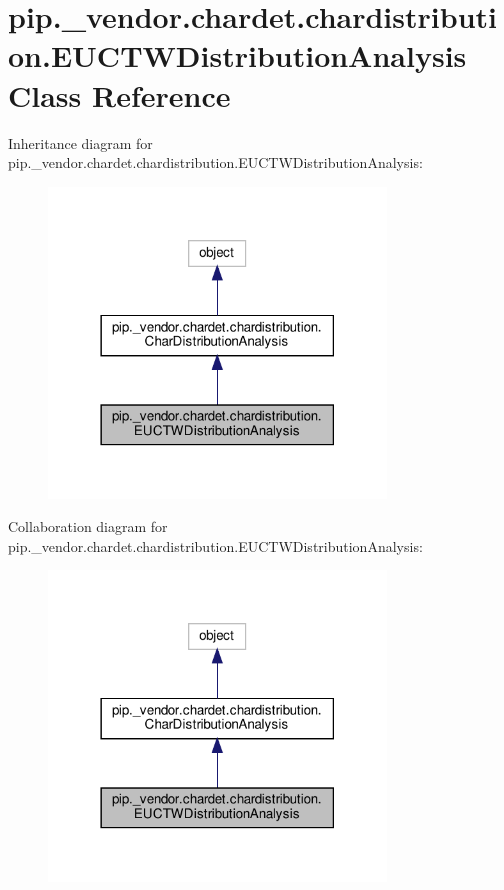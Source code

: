 \hypertarget{classpip_1_1__vendor_1_1chardet_1_1chardistribution_1_1EUCTWDistributionAnalysis}{}\section{pip.\+\_\+vendor.\+chardet.\+chardistribution.\+E\+U\+C\+T\+W\+Distribution\+Analysis Class Reference}
\label{classpip_1_1__vendor_1_1chardet_1_1chardistribution_1_1EUCTWDistributionAnalysis}


Inheritance diagram for pip.\+\_\+vendor.\+chardet.\+chardistribution.\+E\+U\+C\+T\+W\+Distribution\+Analysis\+:
\nopagebreak
\begin{figure}[H]
\begin{center}
\leavevmode
\includegraphics[width=254pt]{classpip_1_1__vendor_1_1chardet_1_1chardistribution_1_1EUCTWDistributionAnalysis__inherit__graph}
\end{center}
\end{figure}


Collaboration diagram for pip.\+\_\+vendor.\+chardet.\+chardistribution.\+E\+U\+C\+T\+W\+Distribution\+Analysis\+:
\nopagebreak
\begin{figure}[H]
\begin{center}
\leavevmode
\includegraphics[width=254pt]{classpip_1_1__vendor_1_1chardet_1_1chardistribution_1_1EUCTWDistributionAnalysis__coll__graph}
\end{center}
\end{figure}

